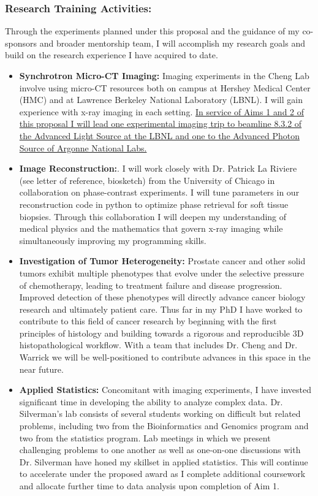 \documentclass{NIHGrant}
\begin{document}
\subsubsection*{Research Training Activities:}
Through the experiments planned under this proposal and the guidance of my co-sponsors and broader mentorship team, I will accomplish my research goals and build on the research experience I have acquired to date.
\begin{itemize}[leftmargin=*, nosep]
  \item \textbf{Synchrotron Micro-CT Imaging:} Imaging experiments in the Cheng Lab involve using micro-CT resources both on campus at Hershey Medical Center (HMC) and at Lawrence Berkeley National Laboratory (LBNL). I will gain experience with x-ray imaging in each setting. \uline{In service of Aims 1 and 2 of this proposal I will lead one experimental imaging trip to beamline 8.3.2 of the Advanced Light Source at the LBNL and one to the Advanced Photon Source of Argonne National Labs.}
  \item \textbf{Image Reconstruction:}. I will work closely with Dr. Patrick La Riviere (see letter of reference, biosketch) from the University of Chicago in collaboration on phase-contrast experiments. I will tune parameters in our reconstruction code in python to optimize phase retrieval for soft tissue biopsies. Through this collaboration I will deepen my understanding of medical physics and the mathematics that govern x-ray imaging while simultaneously improving my programming skills.
  \item \textbf{Investigation of Tumor Heterogeneity:} Prostate cancer and other solid tumors exhibit multiple phenotypes that evolve under the selective pressure of chemotherapy, leading to treatment failure and disease progression. Improved detection of these phenotypes will directly advance cancer biology research and ultimately patient care. Thus far in my PhD I have worked to contribute to this field of cancer research by beginning with the first principles of histology and building towards a rigorous and reproducible 3D histopathological workflow. With a team that includes Dr. Cheng and Dr. Warrick we will be well-positioned to contribute advances in this space in the near future.%
  \item \textbf{Applied Statistics:} Concomitant with imaging experiments, I have invested significant time in developing the ability to analyze complex data. Dr. Silverman's lab consists of several students working on difficult but related problems, including two from the Bioinformatics and Genomics program and two from the statistics program. Lab meetings in which we present challenging problems to one another as well as one-on-one discussions with Dr. Silverman have honed my skillset in applied statistics. This will continue to accelerate under the proposed award as I complete additional coursework and allocate further time to data analysis upon completion of Aim 1.

\end{itemize}
\end{document}

